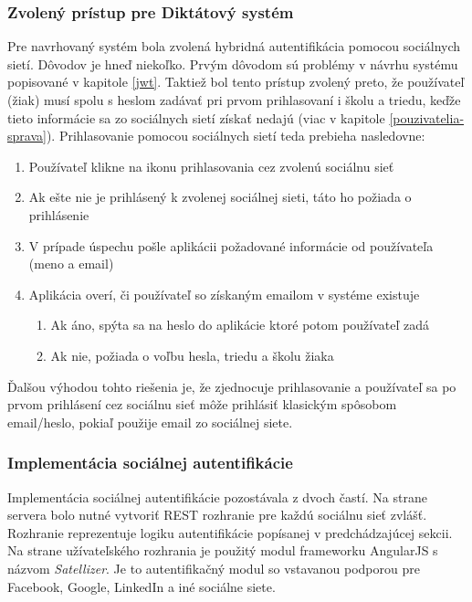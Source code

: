 \documentclass[12pt,oneside]{fithesis2}
\begin{document}
      		\subsubsection{Zvolený prístup pre Diktátový systém}
      		\par Pre navrhovaný systém bola zvolená hybridná autentifikácia pomocou sociálnych sietí. Dôvodov je hneď niekoľko. Prvým dôvodom sú problémy v návrhu systému popisované v kapitole \ref{jwt}. Taktiež bol tento prístup zvolený preto, že používateľ (žiak) musí spolu s heslom zadávať pri prvom prihlasovaní i školu a triedu, keďže tieto informácie sa zo sociálnych sietí získať nedajú (viac v kapitole \ref{pouzivatelia-sprava}). Prihlasovanie pomocou sociálnych sietí teda prebieha nasledovne: 
      		\begin{enumerate}
      		\item Používateľ klikne na ikonu prihlasovania cez zvolenú sociálnu sieť
      		\item Ak ešte nie je prihlásený k zvolenej sociálnej sieti, táto ho požiada o prihlásenie
      		\item V prípade úspechu pošle aplikácii požadované informácie od používateľa (meno a email)
      		\item Aplikácia overí, či používateľ so získaným emailom v systéme existuje
\begin{enumerate}

      		\item Ak áno, spýta sa na heslo do aplikácie ktoré potom používateľ zadá
      		\item Ak nie, požiada o voľbu hesla, triedu a školu žiaka
\end{enumerate}
      		\end{enumerate}
      		
Ďalšou výhodou tohto riešenia je, že zjednocuje prihlasovanie a používateľ sa po prvom prihlásení cez sociálnu sieť môže prihlásiť klasickým spôsobom email/heslo, pokiaľ použije email zo sociálnej siete.

			\subsubsection{Implementácia sociálnej autentifikácie}
			\par Implementácia sociálnej autentifikácie pozostávala z dvoch častí. Na strane servera bolo nutné vytvoriť REST rozhranie pre každú sociálnu sieť zvlášť. Rozhranie reprezentuje logiku autentifikácie popísanej v predchádzajúcej sekcii. Na strane užívateľského rozhrania je použitý modul frameworku AngularJS s názvom \textit{Satellizer}. Je to autentifikačný modul so vstavanou podporou pre Facebook, Google, LinkedIn a iné sociálne siete\cite{yalkabov14}.
      		\pagebreak
\end{document}
